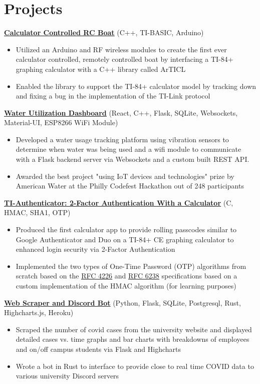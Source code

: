 \documentclass{article}
\begin{document}
\section{Projects}

\textbf{\href{https://youtu.be/dQw4w9WgXcQ}{\underline{Calculator Controlled RC Boat}}} \hfill (C++, TI-BASIC, Arduino)
\begin{itemize}
    \item Utilized an Arduino and RF wireless modules to create the first ever calculator controlled, remotely controlled boat by interfacing a TI-84+ graphing calculator with a C++ library called ArTICL
    \item Enabled the library to support the TI-84+ calculator model by tracking down and fixing a bug in the implementation of the TI-Link protocol
\end{itemize}

\textbf{\href{https://youtu.be/dQw4w9WgXcQ}{\underline{Water Utilization Dashboard}}} \hfill (React, C++, Flask, SQLite, Websockets, Material-UI, ESP8266 WiFi Module)
\begin{itemize}
    \item Developed a water usage tracking platform using vibration sensors to determine when water was being used and a wifi module to communicate with a Flask backend server via Websockets and a custom built REST API.
    \item Awarded the best project "using IoT devices and technologies" prize by American Water at the Philly Codefest Hackathon out of 248 participants
\end{itemize}

\textbf{\href{https://youtu.be/dQw4w9WgXcQ}{\underline{TI-Authenticator: 2-Factor Authentication With a Calculator}}} \hfill (C, HMAC, SHA1, OTP)
\begin{itemize}
    \item Produced the first calculator app to provide rolling passcodes similar to Google Authenticator and Duo on a TI-84+ CE graphing calculator to enhanced login security via 2-Factor Authentication
    \item Implemented the two types of One-Time Password (OTP) algorithms from scratch based on the \href{https://youtu.be/dQw4w9WgXcQ}{\underline{RFC 4226}} and \href{https://youtu.be/dQw4w9WgXcQ}{\underline{RFC 6238}} specifications based on a custom implementation of the HMAC algorithm (for learning purposes)
\end{itemize}

\textbf{\href{https://youtu.be/dQw4w9WgXcQ}{\underline{Web Scraper and Discord Bot}}} \hfill (Python, Flask, SQLite, Postgresql, Rust, Highcharts.js, Heroku)
\begin{itemize}
    \item Scraped the number of covid cases from the university website and displayed detailed cases vs. time graphs and bar charts with breakdowns of employees and on/off campus students via Flask and Highcharts
    \item Wrote a bot in Rust to interface to provide close to real time COVID data to various university Discord servers
\end{itemize}
\end{document}
